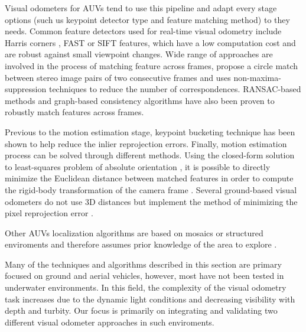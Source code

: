 \documentclass[conference]{IEEEtran}
\begin{document}
Visual odometers for AUVs tend to use this pipeline \cite{Botelho2009} and adapt every stage options (such us keypoint detector type and feature matching method) to they needs. Common feature detectors used for real-time visual odometry include Harris corners \cite{Harris1988,Nister2006}, FAST \cite{Rosten2006,Huang2011} or SIFT \cite{Lowe2004,Botelho2009} features, which have a low computation cost and are robust against small viewpoint changes. Wide range of approaches are involved in the process of matching feature across frames, \cite{Geiger2011} propose a circle match between stereo image pairs of two consecutive frames and uses non-maxima-suppression techniques \cite{Geiger2010} to reduce the number of correspondences. RANSAC-based methods \cite{Nister2004,Johnson2008} and graph-based consistency algorithms \cite{Howard2008} have also been proven to robustly match features across frames.

Previous to the motion estimation stage, keypoint bucketing technique \cite{Zhang1995} has been shown to help reduce the inlier reprojection errors. Finally, motion estimation process can be solved through different methods. Using the closed-form solution to least-squares problem of absolute orientation \cite{Horn1987}, it is possible to directly minimize the Euclidean distance between matched features in order to compute the rigid-body transformation of the camera frame \cite{Huang2011}. Several ground-based visual odometers do not use 3D distances but implement the method of minimizing the pixel reprojection error \cite{Howard2008,Geiger2011}. 

Other AUVs localization algorithms are based on mosaics or structured enviroments and therefore assumes prior knowledge of the area to explore \cite{Garcia2001,Gracias2003,Carreras2003}.

Many of the techniques and algorithms described in this section are primary focused on ground and aerial vehicles, however, most have not been tested in underwater environments. In this field, the complexity of the visual odometry task increases due to the dynamic light conditions and decreasing visibility with depth and turbity. Our focus is primarily on integrating and validating two different visual odometer approaches in such enviroments.
\end{document}
